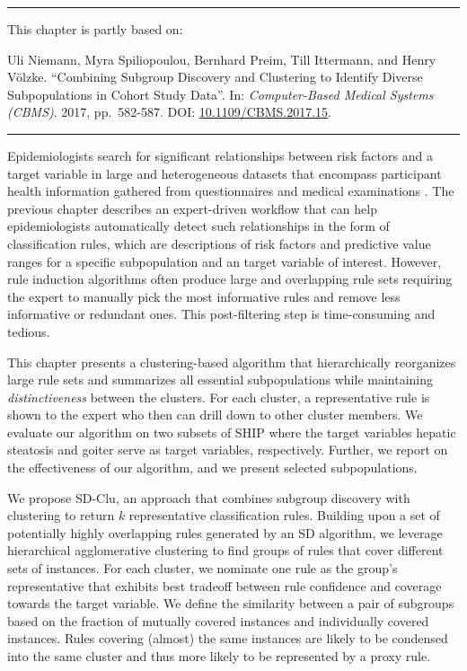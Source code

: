 \documentclass[
  oneside]{book}
\newenvironment{lit}
  {
  \vspace{8pt}
  \hrule
  \vspace{8pt}
  }
  {
  \vspace{8pt}
  \hrule
  \vspace{8pt}
  }
\begin{document}
\begin{lit}

This chapter is partly based on:

Uli Niemann, Myra Spiliopoulou, Bernhard Preim, Till Ittermann, and
Henry Völzke. ``Combining Subgroup Discovery and Clustering to Identify
Diverse Subpopulations in Cohort Study Data''. In: \emph{Computer-Based Medical Systems (CBMS)}. 2017, pp.~582-587. DOI: \href{https://doi.org/10.1109\%2FCBMS.2017.15}{10.1109/CBMS.2017.15}.

\end{lit}

Epidemiologists search for significant relationships between risk factors and a target variable in large and heterogeneous datasets that encompass participant health information gathered from questionnaires and medical examinations \autocite{elmore2020jekel}.
The previous chapter describes an expert-driven workflow that can help epidemiologists automatically detect such relationships in the form of classification rules, which are descriptions of risk factors and predictive value ranges for a specific subpopulation and an target variable of interest.
However, rule induction algorithms often produce large and overlapping rule sets requiring the expert to manually pick the most informative rules and remove less informative or redundant ones.
This post-filtering step is time-consuming and tedious.

This chapter presents a clustering-based algorithm that hierarchically reorganizes large rule sets and summarizes all essential subpopulations while maintaining \emph{distinctiveness} between the clusters.
For each cluster, a representative rule is shown to the expert who then can drill down to other cluster members.
We evaluate our algorithm on two subsets of SHIP where the target variables hepatic steatosis and goiter serve as target variables, respectively.
Further, we report on the effectiveness of our algorithm, and we present selected subpopulations.

We propose SD-Clu, an approach that combines subgroup discovery with clustering to return \(k\) representative classification rules.
Building upon a set of potentially highly overlapping rules generated by an SD algorithm, we leverage hierarchical agglomerative clustering to find groups of rules that cover different sets of instances.
For each cluster, we nominate one rule as the group's representative that exhibits best tradeoff between rule confidence and coverage towards the target variable.
We define the similarity between a pair of subgroups based on the fraction of mutually covered instances and individually covered instances.
Rules covering (almost) the same instances are likely to be condensed into the same cluster and thus more likely to be represented by a proxy rule.
\end{document}
